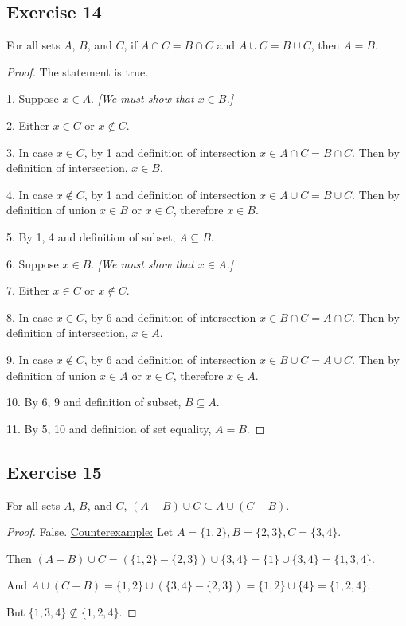 \documentclass[14pt]{extarticle}
\begin{document}
\subsection{Exercise 14}
For all sets $A$, $B$, and $C$, if \(A \cap C = B \cap C\) and \(A \cup C = B \cup C\), then $A = B$.

\begin{proof}
The statement is true. 

1. Suppose \(x \in A\). {\it [We must show that \(x \in B\).]}

2. Either \(x \in C\) or \(x \notin C\). 

3. In case \(x \in C\), by 1 and definition of intersection \(x \in A \cap C = B \cap C\). 
Then by definition of intersection, \(x \in B\). 

4. In case \(x \notin C\), by 1 and definition of intersection \(x \in A \cup C = B \cup C\). 
Then by definition of union \(x \in B\) or \(x \in C\), therefore \(x \in B\).

5. By 1, 4 and definition of subset, \(A \subseteq B\).

6. Suppose \(x \in B\). {\it [We must show that \(x \in A\).]}

7. Either \(x \in C\) or \(x \notin C\). 

8. In case \(x \in C\), by 6 and definition of intersection \(x \in B \cap C = A \cap C\). 
Then by definition of intersection, \(x \in A\). 

9. In case \(x \notin C\), by 6 and definition of intersection \(x \in B \cup C = A \cup C\). 
Then by definition of union \(x \in A\) or \(x \in C\), therefore \(x \in A\).

10. By 6, 9 and definition of subset, \(B \subseteq A\).

11. By 5, 10 and definition of set equality, $A = B$.
\end{proof}

\subsection{Exercise 15}
For all sets $A$, $B$, and $C$, \((A - B) \cup C \subseteq A \cup (C - B)\).

\begin{proof}
False. \underline{Counterexample:} Let \(A = \{1, 2\}, B = \{2, 3\}, C = \{3, 4\}\). 

Then \((A - B) \cup C = (\{1, 2\} - \{2, 3\}) \cup \{3, 4\} = \{1\} \cup \{3, 4\} = \{1, 3, 4\}\). 

And \(A \cup (C - B) = \{1, 2\} \cup (\{3, 4\} - \{2, 3\}) = \{1, 2\} \cup \{4\} = \{1, 2, 4\}\). 

But \(\{1, 3, 4\} \nsubseteq \{1, 2, 4\}\).
\end{proof}
\end{document}

